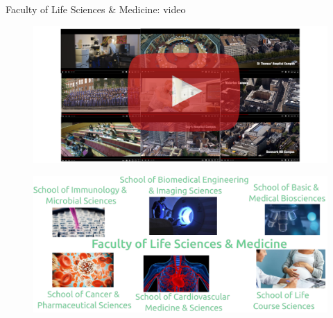 
{
\begin{frame}{Faculty of Life Sciences \& Medicine: video}

  \begin{figure}
  \centering
  \includegraphics[width=1.0\textwidth]{./../figures/videos-life-science-and-medicine/versions/drawing-v00}
  \end{figure}

\end{frame}
}






{
\begin{frame}{}

  \begin{figure}
  \centering
  \includegraphics[width=1.0\textwidth]{./../figures/schools-at-life-science-and-medicine/versions/drawing-v00}
  \end{figure}

\end{frame}
}


